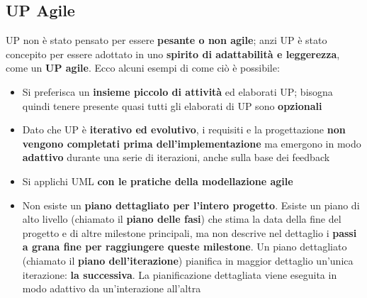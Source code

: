 \documentclass[12pt]{article}
\begin{document}
\subsection{UP Agile}
UP non è stato pensato per essere \textbf{pesante o non agile}; anzi UP è stato concepito per essere adottato in uno \textbf{spirito di adattabilità e leggerezza}, come un \textbf{UP agile}.
Ecco alcuni esempi di come ciò è possibile:
\begin{itemize}
    \item Si preferisca un \textbf{insieme piccolo di attività} ed elaborati UP; bisogna quindi tenere presente quasi tutti gli elaborati di UP sono \textbf{opzionali}
    \item Dato che UP è \textbf{iterativo ed evolutivo}, i requisiti e la progettazione \textbf{non vengono completati prima dell'implementazione} ma emergono in modo \textbf{adattivo} durante una serie di iterazioni, anche sulla base dei feedback
    \item Si applichi UML \textbf{con le pratiche della modellazione agile}
    \item Non esiste un \textbf{piano dettagliato per l'intero progetto}. Esiste un piano di alto livello (chiamato il \textbf{piano delle fasi}) che stima la data della fine del progetto e di altre milestone principali, ma non descrive nel dettaglio i \textbf{passi a grana fine per raggiungere queste milestone}.
    Un piano dettagliato (chiamato il \textbf{piano dell'iterazione}) pianifica in maggior dettaglio un'unica iterazione: \textbf{la successiva}. La pianificazione dettagliata viene eseguita in modo adattivo da un'interazione all'altra
\end{itemize}
\end{document}
